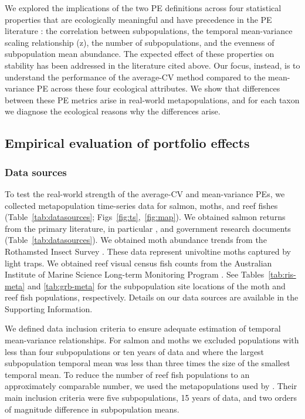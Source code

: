 We explored the implications of the two PE definitions across four statistical
properties that are ecologically meaningful and have precedence in the PE
literature \citep{tilman1999, cottingham2001, loreau2010,
thibaut2013}: the correlation between subpopulations, the temporal
mean-variance scaling relationship (z), the number of subpopulations, and the
evenness of subpopulation mean abundance. The expected effect of these
properties on  stability
has been addressed in the literature cited
above. Our focus, instead, is to understand the performance of the average-CV
method compared to the mean-variance PE across these four ecological
attributes. We show that differences between these PE metrics arise in
real-world metapopulations, and for each taxon we diagnose the ecological
reasons why the differences arise.

\subsection{Empirical evaluation of portfolio effects}

\subsubsection{Data sources}

To test the real-world strength of the average-CV and mean-variance PEs, we
collected metapopulation time-series data for salmon, moths, and reef fishes
(Table~\ref{tab:datasources}; Figs~\ref{fig:ts},~\ref{fig:map}).
We obtained salmon returns from the primary
literature, in particular \citet{dorner2008}, and government research
documents (Table~\ref{tab:datasources}). We obtained moth abundance trends from
the Rothamsted Insect Survey \citep{conrad2004}. These data represent
univoltine moths captured by light traps. We obtained reef visual census fish
counts from the Australian Institute of Marine Science Long-term Monitoring
Program \citep{sweatman2008}. See Tables~\ref{tab:ris-meta} and
\ref{tab:grb-meta} for the subpopulation site locations of the moth and reef
fish populations, respectively. Details on our data sources are available in the
Supporting Information.

We defined data inclusion criteria to ensure adequate estimation of temporal
mean-variance relationships. For salmon and moths we excluded populations
with less than four subpopulations or ten years of data and where the largest
subpopulation temporal mean was less than three times the size of the smallest
temporal mean. To reduce the number of reef fish populations to an
approximately comparable number, we used the metapopulations used by
\citet{mellin2010}. Their main inclusion criteria were five
subpopulations, 15 years of data, and two orders of magnitude difference in
subpopulation means.


